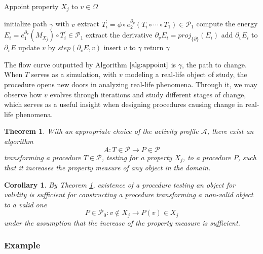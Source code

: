 \documentclass{article}
\newcommand{\dP}{\mathcal{P}}
\newcommand{\D}{\partial}
\newtheorem{izrek}{Theorem}[section]
\newtheorem{corollary}{Corollary}[section]
\begin{document}
   \begin{algorithm}[hb!]
   \caption{Appoint property $X_j$ to $v\in \Omega$}
   \label{alg:appoint}
   \begin{algorithmic}[1]
   \State initialize path $\gamma$ with $v$
   \State extract $T^\prime_i=\phi\circ e^{\D_{v}}_2(T_i\circ\cdots\circ T_1)\in\dP_1$
   \State compute the energy $E_i=e^{\D_v}_1(M_{X_j})\circ T^\prime_i\in\dP_1$
   \State extract the derivative $\D_v E_i=proj_{\{\D\}}(E_i)$
   \State add $\D_v E_i$ to $\D_v E$
   \EndFor
   \State update $v$ by $step(\D_v E,v)$
   \State insert $v$ to $\gamma$
   \EndFor
   \State return $\gamma$
   \EndProcedure
   \end{algorithmic}
   \end{algorithm}
   
    The flow curve outputted by Algorithm $\ref{alg:appoint}$ is $\gamma$, the path to change. When $T$ serves as a simulation, with $v$ modeling a real-life object of study, the procedure opens new doors in analyzing real-life phenomena. Through it, we may observe how $v$ evolves through iterations and study different stages of change, which serves as a useful insight when designing procedures causing change in real-life phenomena.
   
   \begin{izrek}\label{izr:algA}
        With an appropriate choice of the activity profile $\mathcal{A}$, there exist an algorithm
        \begin{equation}\label{eq:algA}
          A:T\in\dP\to P\in\dP
          \end{equation}
          transforming a procedure $T\in\dP$, testing for a property $X_j$, to a procedure $P$, such that it increases the property measure of any object in the domain. 
        \end{izrek}
        \begin{corollary}
           By Theorem \ref{izr:algA}, existence of a procedure testing an object for validity is sufficient for constructing a procedure transforming a non-valid object to a valid one
           $$P\in \dP_0:v\notin X_j\to P(v)\in X_j$$
           under the assumption that the increase of the property measure is sufficient.
           \end{corollary}
   
   \subsubsection{Example}
   
\end{document}
